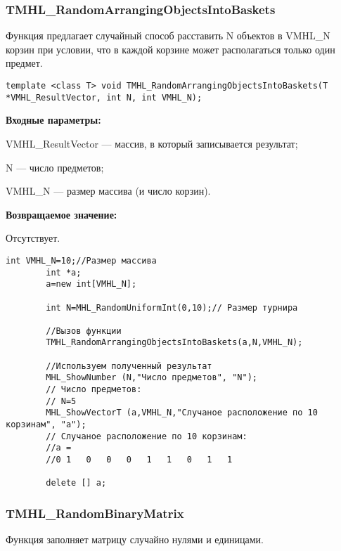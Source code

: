 \documentclass[a4paper,12pt]{article}
\begin{document}
\subsubsection{TMHL\_RandomArrangingObjectsIntoBaskets}\label{TMHL_RandomArrangingObjectsIntoBaskets}

Функция предлагает случайный способ расставить N объектов в VMHL\_N корзин при условии, что в каждой корзине может располагаться только один предмет.


\begin{lstlisting}[label=code_syntax_TMHL_RandomArrangingObjectsIntoBaskets,caption=Синтаксис]
template <class T> void TMHL_RandomArrangingObjectsIntoBaskets(T *VMHL_ResultVector, int N, int VMHL_N);
\end{lstlisting}

\textbf{Входные параметры:} 
 
VMHL\_ResultVector --- массив, в который записывается результат;
 
N --- число предметов;
 
VMHL\_N --- размер массива (и число корзин).

\textbf{Возвращаемое значение:}

Отсутствует.


\begin{lstlisting}[label=code_use_TMHL_RandomArrangingObjectsIntoBaskets,caption=Пример использования]
        int VMHL_N=10;//Размер массива
        int *a;
        a=new int[VMHL_N];

        int N=MHL_RandomUniformInt(0,10);// Размер турнира

        //Вызов функции
        TMHL_RandomArrangingObjectsIntoBaskets(a,N,VMHL_N);

        //Используем полученный результат
        MHL_ShowNumber (N,"Число предметов", "N");
        // Число предметов:
        // N=5
        MHL_ShowVectorT (a,VMHL_N,"Случаное расположение по 10 корзинам", "a");
        // Случаное расположение по 10 корзинам:
        //a =
        //0	1	0	0	0	1	1	0	1	1

        delete [] a;
\end{lstlisting}

\subsubsection{TMHL\_RandomBinaryMatrix}\label{TMHL_RandomBinaryMatrix}

Функция заполняет матрицу случайно нулями и единицами.
\end{document}
